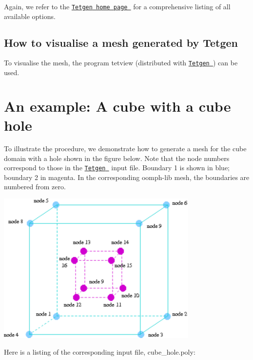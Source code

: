 Again, we refer to the \href{http://wias-berlin.de/software/tetgen//}{\tt {\ttfamily Tetgen} home page } for a comprehensive listing of all available options.



\hypertarget{index_tetview}{}\subsection{How to visualise a mesh generated by Tetgen}\label{index_tetview}
To visualise the mesh, the program {\ttfamily tetview} (distributed with \href{http://wias-berlin.de/software/tetgen//}{\tt {\ttfamily Tetgen} }) can be used.



\hypertarget{index_example}{}\section{An example\+: A cube with a cube hole}\label{index_example}
To illustrate the procedure, we demonstrate how to generate a mesh for the cube domain with a hole shown in the figure below. Note that the node numbers correspond to those in the \href{http://wias-berlin.de/software/tetgen//}{\tt {\ttfamily Tetgen} } input file. Boundary 1 is shown in blue; boundary 2 in magenta. In the corresponding {\ttfamily oomph-\/lib} mesh, the boundaries are numbered from zero.

 
\begin{DoxyImage}
\includegraphics[width=0.75\textwidth]{cube_hole}
\end{DoxyImage}


Here is a listing of the corresponding input file, {\ttfamily cube\+\_\+hole.\+poly\+:} 


